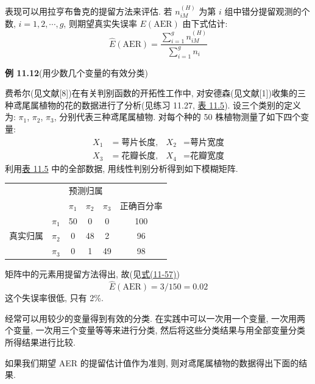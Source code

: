 
表现可以用拉亨布鲁克的提留方法来评估. 若 $n_{iM}^{(H)}$ 为第 $i$ 组中错分提留观测的个数, $i=1,2,\cdots,g$, 则期望真实失误率 $E(\mathrm{AER})$ 由下式估计:
\label{eq:11-57}
\begin{equation}
\hat{E}(\mathrm{AER})=\frac{\sum_{i=1}^{g}n_{iM}^{(H)}}{\sum_{i=1}^{g}n_i}
\tag{11-57}
\end{equation}

\noindent\textbf{例 11.12}\quad (用少数几个变量的有效分类)

费希尔(见文献[8])在有关判别函数的开拓性工作中, 对安德森(见文献[1])收集的三种鸢尾属植物的花的数据进行了分析(见练习 11.27, \hyperref[tab:11.5]{表 11.5}). 设三个类别的定义为: $\pi_1$, $\pi_2$, $\pi_3$, 分别代表三种鸢尾属植物. 对每个种的 50 株植物测量了如下四个变量:
\[
\begin{aligned}
X_1&=\text{萼片长度}, & X_2&=\text{萼片宽度}\\
X_3&=\text{花瓣长度}, & X_4&=\text{花瓣宽度}
\end{aligned}
\]
利用\hyperref[tab:11.5]{表 11.5} 中的全部数据, 用线性判别分析得到如下模糊矩阵.

\begin{mvtable}
\begin{tabular}{ll|ccc|c}
\toprule
\multicolumn{6}{c}{预测归属}\\
& & $\pi_1$ & $\pi_2$ & $\pi_3$ & 正确百分率\\
\midrule
\multirow{3}{*}{真实归属} & $\pi_1$ & 50 & 0 & 0 & 100\\
& $\pi_2$ & 0 & 48 & 2 & 96\\
& $\pi_3$ & 0 & 1 & 49 & 98\\
\bottomrule
\end{tabular}
\end{mvtable}

矩阵中的元素用提留方法得出, 故(见\hyperref[eq:11-57]{式(11-57)})
\[
\hat{E}(\mathrm{AER})=3/150=0.02
\]
这个失误率很低, 只有 2\%.

经常可以用较少的变量得到有效的分类. 在实践中可以一次用一个变量, 一次用两个变量, 一次用三个变量等等来进行分类, 然后将这些分类结果与用全部变量分类所得结果进行比较.

如果我们期望 AER 的提留估计值作为准则, 则对鸢尾属植物的数据得出下面的结果.

